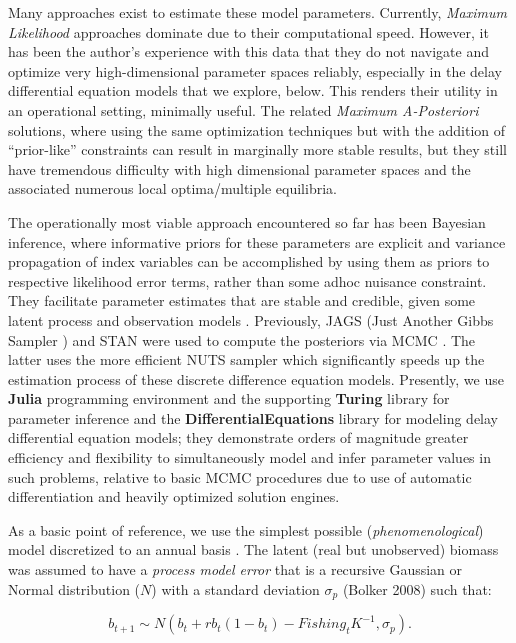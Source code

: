 \documentclass[
	letterpaper, %
	10pt, %
]{article}
\begin{document}
Many approaches exist to estimate these model parameters. Currently,
\emph{Maximum Likelihood} approaches dominate due to their computational
speed. However, it has been the author's experience with this data that they do not
navigate and optimize very high-dimensional parameter spaces reliably,
especially in the delay differential equation models that we explore, below.
This renders their utility in an operational setting, minimally useful.
The related \emph{Maximum A-Posteriori} solutions, where using the
same optimization techniques but with the addition of ``prior-like'' constraints
can result in marginally more stable results, but they still have tremendous
difficulty with high dimensional parameter spaces and the associated numerous local
optima/multiple equilibria.

The operationally most viable approach encountered so far has been
Bayesian inference, where informative priors for these parameters
are explicit and variance propagation of index variables can be accomplished
by using them as priors to respective likelihood error terms, rather than some adhoc nuisance constraint. They facilitate parameter estimates that are stable and credible, given
some latent process and observation models \cite{Meyer_Millar_1999}.
Previously, JAGS (Just Another Gibbs Sampler \cite{Plummer_2003})
and STAN \cite{Stan_2022} were
used to compute the posteriors via MCMC \cite{Choi_Zisserson_2011}.
The latter uses the more efficient NUTS sampler which significantly
speeds up the estimation process of these discrete difference equation
models. Presently, we use \textbf{Julia} programming environment \cite{Bezanson_et_al_2017} and
the supporting \textbf{Turing} library \cite{Ge_et_al_2018} for
parameter inference and the \textbf{DifferentialEquations} library \cite{Rackauckas_Nie_2017} for
modeling delay differential equation models; they demonstrate orders
of magnitude greater efficiency and flexibility to simultaneously model 
and infer parameter values in such problems,
relative to basic MCMC procedures due to use of automatic differentiation
and heavily optimized solution engines.

As a basic point of reference, we use the simplest possible (\emph{phenomenological})
model discretized to an annual basis \cite{Choi_Zisserson_2011}. The latent (real but
unobserved) biomass was assumed to have a \emph{process model error}
that is a recursive Gaussian or Normal distribution ($N$) with a standard deviation $\sigma_{p}$ {(Bolker 2008)} such that:


\begin{equation}
	\label{eq2}
	b_{t+1}\sim N({{{b_{t}+r}b_{t}}{{({1-b_{t}})}-\mathit{Fishin}}g_{t}K^{-1},\sigma_{p}}). 
	\end{equation}
\end{document}
